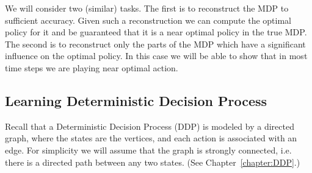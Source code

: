 We will consider two (similar) tasks. The first is to reconstruct
the MDP to sufficient accuracy. Given such a reconstruction we can
compute the optimal policy for it and be guaranteed that it is a
near optimal policy in the true MDP. The second is to reconstruct
only the parts of the MDP which have a significant influence on the
optimal policy. In this case we will be able to show that in most
time steps we are playing near optimal action.

\subsection{Learning Deterministic Decision Process}

Recall that a Deterministic Decision Process (DDP) is modeled by a
directed graph, where the states are the vertices, and each action
is associated with an edge. For simplicity we will assume that the
graph is strongly connected, i.e. there is a directed path between
any two states. (See Chapter~\ref{chapter:DDP}.)

%
%
%
%
%
%
%

